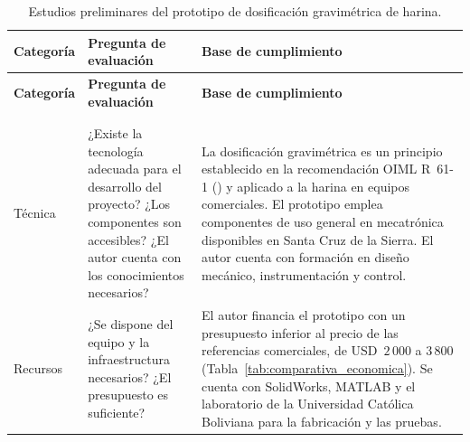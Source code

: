 {\footnotesize
{}
\setlength{\tabcolsep}{4pt}
\renewcommand{\arraystretch}{1.35}

\begin{xltabular}{\textwidth}{
    >{\raggedright\arraybackslash}p{0.14\textwidth}
    >{\raggedright\arraybackslash}p{0.26\textwidth}
    >{\raggedright\arraybackslash}X}
    \caption{Estudios preliminares del prototipo de dosificación gravimétrica
    de harina.}
    \label{tab:estudios_preliminares} \\
    \toprule[1pt]
    \textbf{Categoría} &
    \textbf{Pregunta de evaluación} &
    \textbf{Base de cumplimiento} \\
    \midrule[1pt]
    \endfirsthead
    \toprule[1pt]
    \textbf{Categoría} &
    \textbf{Pregunta de evaluación} &
    \textbf{Base de cumplimiento} \\
    \midrule[1pt]
    \endhead

    \midrule
    \endfoot

    \bottomrule[1pt]
     \\
    \endlastfoot

     \\
    \midrule

    Técnica &
    ¿Existe la tecnología adecuada para el desarrollo del proyecto?
    ¿Los componentes son accesibles?
    ¿El autor cuenta con los conocimientos necesarios? &
    La dosificación gravimétrica es un principio establecido en la
    recomendación OIML R~61-1 (\citeyear{oiml2017r61}) y aplicado a la
    harina en equipos comerciales. El prototipo emplea componentes de uso
    general en mecatrónica disponibles en Santa Cruz de la Sierra. El autor
    cuenta con formación en diseño mecánico, instrumentación y control. \\
    \midrule

    Recursos &
    ¿Se dispone del equipo y la infraestructura necesarios?
    ¿El presupuesto es suficiente? &
    El autor financia el prototipo con un presupuesto inferior al precio de
    las referencias comerciales, de USD~$2\,000$ a $3\,800$
    (Tabla~\ref{tab:comparativa_economica}). Se cuenta con SolidWorks,
    MATLAB y el laboratorio de la Universidad Católica Boliviana para la
    fabricación y las pruebas. \\
    \midrule


\end{xltabular}}
